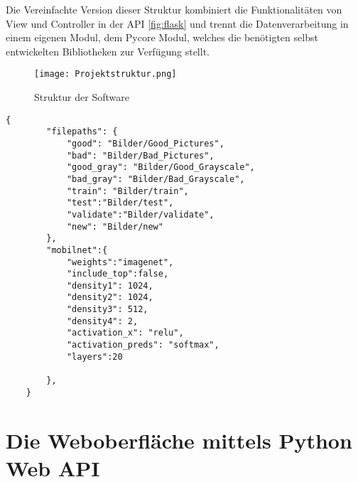 Die Vereinfachte Version dieser Struktur kombiniert die Funktionalitäten von View und Controller in der API \autoref{fig:flask} und trennt die Datenverarbeitung in einem eigenen Modul, dem Pycore Modul, welches die benötigten selbst entwickelten Bibliotheken zur Verfügung stellt. 

\begin{figure}[H]
    \centering
    \texttt{[image: Projektstruktur.png]}
    \caption{Struktur der Software}
    \label{fig:Projektstruktur}
\end{figure}


\begin{lstlisting}[style=json, label=lst:json_example, caption={Beispiel einer \ac{JSON}-Datei mit Pflanzendaten}]
    {
        "filepaths": {
            "good": "Bilder/Good_Pictures",
            "bad": "Bilder/Bad_Pictures",
            "good_gray": "Bilder/Good_Grayscale",
            "bad_gray": "Bilder/Bad_Grayscale",
            "train": "Bilder/train",
            "test":"Bilder/test",
            "validate":"Bilder/validate",
            "new": "Bilder/new"
        },
        "mobilnet":{
            "weights":"imagenet",
            "include_top":false,
            "density1": 1024,
            "density2": 1024,
            "density3": 512,
            "density4": 2,
            "activation_x": "relu",
            "activation_preds": "softmax",
            "layers":20

        },
    }
\end{lstlisting}

\section{Die Weboberfläche mittels Python Web API} \label{sec:weboberflaeche}